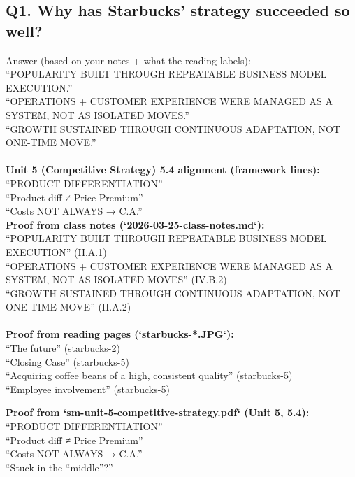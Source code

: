 \documentclass[10pt,a4paper]{article}
\begin{document}
\subsection*{\color{eublue}Q1. Why has Starbucks' strategy succeeded so well?}
Answer (based on your notes + what the reading labels):
\\
``POPULARITY BUILT THROUGH REPEATABLE BUSINESS MODEL EXECUTION.''
\\
``OPERATIONS + CUSTOMER EXPERIENCE WERE MANAGED AS A SYSTEM, NOT AS ISOLATED MOVES.''
\\
``GROWTH SUSTAINED THROUGH CONTINUOUS ADAPTATION, NOT ONE-TIME MOVE.''
\\
\\
\textbf{Unit 5 (Competitive Strategy) 5.4 alignment (framework lines):}
\\
``PRODUCT DIFFERENTIATION''
\\
``Product diff ≠ Price Premium''
\\
``Costs NOT ALWAYS → C.A.''
\\
\textbf{Proof from class notes (`2026-03-25-class-notes.md`):}
\\
``POPULARITY BUILT THROUGH REPEATABLE BUSINESS MODEL EXECUTION'' (II.A.1)
\\
``OPERATIONS + CUSTOMER EXPERIENCE WERE MANAGED AS A SYSTEM, NOT AS ISOLATED MOVES'' (IV.B.2)
\\
``GROWTH SUSTAINED THROUGH CONTINUOUS ADAPTATION, NOT ONE-TIME MOVE'' (II.A.2)
\\
\\
\textbf{Proof from reading pages (`starbucks-*.JPG`):}
\\
``The future'' (starbucks-2)
\\
``Closing Case'' (starbucks-5)
\\
``Acquiring coffee beans of a high, consistent quality'' (starbucks-5)
\\
``Employee involvement'' (starbucks-5)

\textbf{Proof from `sm-unit-5-competitive-strategy.pdf` (Unit 5, 5.4):}
\\
``PRODUCT DIFFERENTIATION''
\\
``Product diff ≠ Price Premium''
\\
``Costs NOT ALWAYS → C.A.''
\\
``Stuck in the “middle”?'' 
\end{document}
